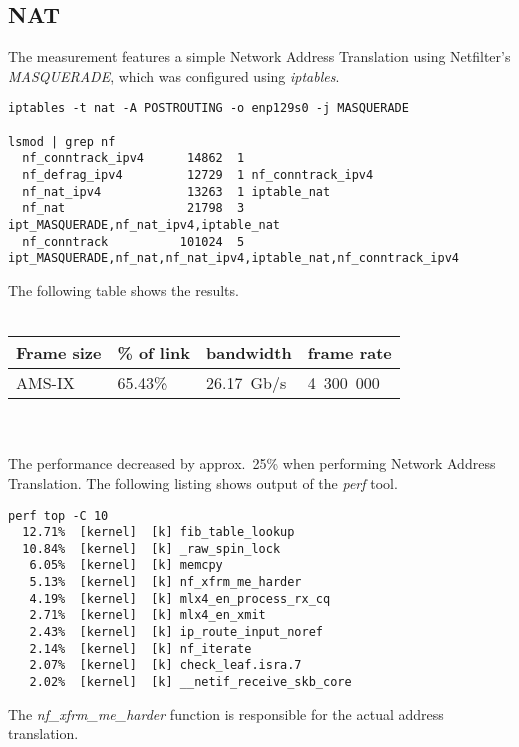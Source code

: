 
\subsection{NAT}
The measurement features a simple Network Address Translation using Netfilter's {\it{MASQUERADE}},
which was configured using {\it{iptables}}.
\begin{lstlisting}
iptables -t nat -A POSTROUTING -o enp129s0 -j MASQUERADE

lsmod | grep nf
  nf_conntrack_ipv4      14862  1 
  nf_defrag_ipv4         12729  1 nf_conntrack_ipv4
  nf_nat_ipv4            13263  1 iptable_nat
  nf_nat                 21798  3 ipt_MASQUERADE,nf_nat_ipv4,iptable_nat
  nf_conntrack          101024  5 ipt_MASQUERADE,nf_nat,nf_nat_ipv4,iptable_nat,nf_conntrack_ipv4
\end{lstlisting}
The following table shows the results.
\\
\\
\begin{tabular}{ | l | l | l | l | }
\hline
Frame size & \% of link & bandwidth & frame rate \\
\hline
AMS-IX & 65.43\% & 26.17~Gb/s & 4~300~000 \\
\hline
\end{tabular}
\\
\\
The performance decreased by approx.~25\% when performing Network Address Translation.
The following listing shows output of the {\it{perf}} tool.
\begin{lstlisting}
perf top -C 10
  12.71%  [kernel]  [k] fib_table_lookup
  10.84%  [kernel]  [k] _raw_spin_lock
   6.05%  [kernel]  [k] memcpy
   5.13%  [kernel]  [k] nf_xfrm_me_harder
   4.19%  [kernel]  [k] mlx4_en_process_rx_cq
   2.71%  [kernel]  [k] mlx4_en_xmit
   2.43%  [kernel]  [k] ip_route_input_noref
   2.14%  [kernel]  [k] nf_iterate
   2.07%  [kernel]  [k] check_leaf.isra.7
   2.02%  [kernel]  [k] __netif_receive_skb_core
\end{lstlisting}
The {\it{nf\_xfrm\_me\_harder}} function is responsible for the actual address translation.
